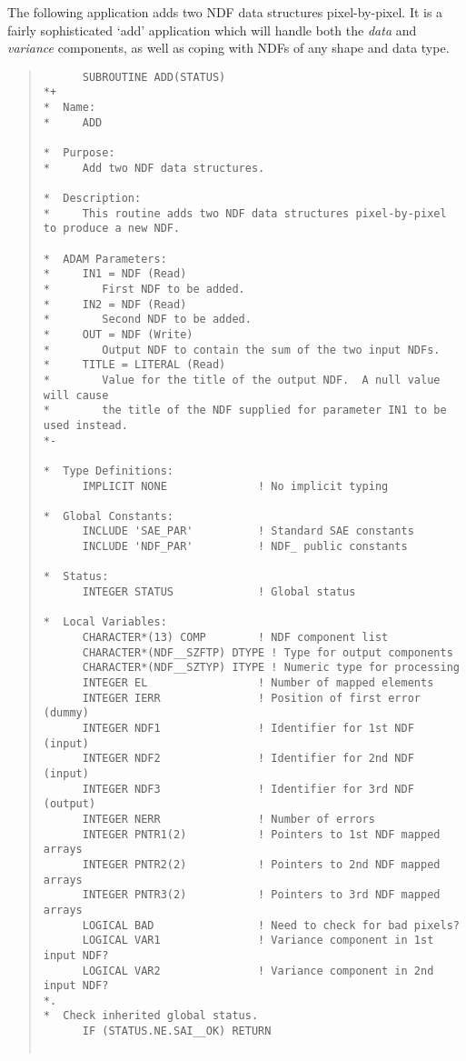 The following application adds two NDF data structures pixel-by-pixel.
It is a fairly sophisticated `add' application which will handle both the {\em
data\/} and {\em variance\/} components, as well as coping with NDFs of any
shape and data type.

\begin{quote}

\begin{small}
\begin{verbatim}
      SUBROUTINE ADD(STATUS)
*+
*  Name:
*     ADD

*  Purpose:
*     Add two NDF data structures.

*  Description:
*     This routine adds two NDF data structures pixel-by-pixel to produce a new NDF.

*  ADAM Parameters:
*     IN1 = NDF (Read)
*        First NDF to be added.
*     IN2 = NDF (Read)
*        Second NDF to be added.
*     OUT = NDF (Write)
*        Output NDF to contain the sum of the two input NDFs.
*     TITLE = LITERAL (Read)
*        Value for the title of the output NDF.  A null value will cause
*        the title of the NDF supplied for parameter IN1 to be used instead.
*-
      
*  Type Definitions:
      IMPLICIT NONE              ! No implicit typing

*  Global Constants:
      INCLUDE 'SAE_PAR'          ! Standard SAE constants
      INCLUDE 'NDF_PAR'          ! NDF_ public constants

*  Status:
      INTEGER STATUS             ! Global status

*  Local Variables:
      CHARACTER*(13) COMP        ! NDF component list
      CHARACTER*(NDF__SZFTP) DTYPE ! Type for output components
      CHARACTER*(NDF__SZTYP) ITYPE ! Numeric type for processing
      INTEGER EL                 ! Number of mapped elements
      INTEGER IERR               ! Position of first error (dummy)
      INTEGER NDF1               ! Identifier for 1st NDF (input)
      INTEGER NDF2               ! Identifier for 2nd NDF (input)
      INTEGER NDF3               ! Identifier for 3rd NDF (output)
      INTEGER NERR               ! Number of errors
      INTEGER PNTR1(2)           ! Pointers to 1st NDF mapped arrays
      INTEGER PNTR2(2)           ! Pointers to 2nd NDF mapped arrays
      INTEGER PNTR3(2)           ! Pointers to 3rd NDF mapped arrays
      LOGICAL BAD                ! Need to check for bad pixels?
      LOGICAL VAR1               ! Variance component in 1st input NDF?
      LOGICAL VAR2               ! Variance component in 2nd input NDF?
*.
*  Check inherited global status.
      IF (STATUS.NE.SAI__OK) RETURN


\end{verbatim}
\end{small}
\end{quote}
